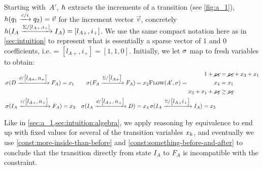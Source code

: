 Starting with~$A'$, $h$ extracts the increments of a transition (see
\cref{fig:a_1}), $h(q_1 \xrightarrow{c / i} q_2) = \Vec{v}$ for the increment
vector $\Vec{v}$, concretely $h(I_A \xrightarrow{\Sigma / \left[ l_{A+}, i_+
\right]} I_A) = \left[ l_{A+}, i_+ \right]$. We use the same compact notation
here as in \cref{sec:intuition} to represent what is essentially a sparse vector
of $1$ and $0$ coefficients, i.e. = $\left[ l_{A+}, i_+ \right] = \left[1, 1,
0\right]$. Initially, we let $\operatorname{\sigma}$ map to fresh variables to obtain:
\begin{equation}\label{eq:single-filter}
    \begin{aligned}
      & \operatorname{\sigma}(D \xrightarrow{d/\begin{bmatrix}l_{A+}, n_+\end{bmatrix}} F_A) = x_1
        & \operatorname{\sigma}(F_A \xrightarrow{\Sigma/\begin{bmatrix} l_{A+} \end{bmatrix}} F_A ) = x_2   
        & \textsc{Flow}(A', \operatorname{\sigma})  = \begin{aligned}
                       1 + \cancel{x_5} &= \cancel{x_5} + x_3 + x_1\\
                    x_4 &= x_1 \\
                    x_3 + x_1 + \cancel{x_2} &\geq \cancel{x_2}  \\
                    \end{aligned} \\
      &\operatorname{\sigma}(I_A \xrightarrow{c/\begin{bmatrix}l_{A+}, n_+\end{bmatrix}} F_A ) =  x_3 
          & \operatorname{\sigma}(I_A \xrightarrow{d/\begin{bmatrix}l_{A+}, n_+\end{bmatrix}} D) = x_4
          & \operatorname{\sigma}(I_A \xrightarrow{\Sigma/\begin{bmatrix} l_{A+} i_+\end{bmatrix}} I_A) = x_5  
    \end{aligned}
\end{equation}

Like in \cref{sec:a_1,sec:intuition:algebra}, we apply reasoning by equivalence
  to end up with fixed values for several of the transition variables
  $x_k$, and eventually we use \cref{const:more-inside-than-before}
  and \cref{const:something-before-and-after} to conclude that the transition
  directly from state $I_{A}$ to $F_{A}$ is incompatible with the constraint.

